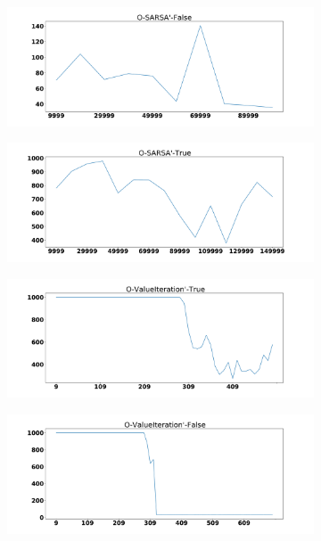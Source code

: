 \documentclass{amsart}
\begin{document}
        \begin{figure}
    \centering
    \begin{subfigure}[t]{0.3\textwidth}
    \centering
    \includegraphics[width=\textwidth]{Otrack_2_learning_rate.pdf}
    \end{subfigure}
    \begin{subfigure}[t]{0.3\textwidth}
    \centering
    \includegraphics[width=\textwidth]{Otrack_3_learning_rate.pdf}
    \end{subfigure}
    \begin{subfigure}[t]{0.3\textwidth}
    \centering
    \includegraphics[width=\textwidth]{Otrack_6_learning_rate.pdf}
    \end{subfigure}
    \begin{subfigure}[t]{0.3\textwidth}
    \centering
    \includegraphics[width=\textwidth]{Otrack_5_learning_rate.pdf}

\end{subfigure}
\end{figure}
\end{document}
